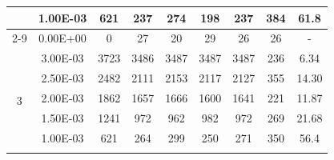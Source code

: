 \begin{table}[H]
{\begin{tabular}{|c|c|c|c|c|c|c|c|c|}
                               & 1.00E-03         & 621       & 237                                                        & 274                                                       & 198                                                       & 237     & 384    & 61.8                                                               \\ \cline{2-9}
                               & 0.00E+00         & 0         & 27                                                         & 20                                                        & 29                                                        & 26      & 26     & -                                                                  \\ \hline
            \multirow{6}{*}{3} & 3.00E-03         & 3723      & 3486                                                       & 3487                                                      & 3487                                                      & 3487    & 236    & 6.34                                                               \\ \cline{2-9}
                               & 2.50E-03         & 2482      & 2111                                                       & 2153                                                      & 2117                                                      & 2127    & 355    & 14.30                                                              \\ \cline{2-9}
                               & 2.00E-03         & 1862      & 1657                                                       & 1666                                                      & 1600                                                      & 1641    & 221    & 11.87                                                              \\ \cline{2-9}
                               & 1.50E-03         & 1241      & 972                                                        & 962                                                       & 982                                                       & 972     & 269    & 21.68                                                              \\ \cline{2-9}
                               & 1.00E-03         & 621       & 264                                                        & 299                                                       & 250                                                       & 271     & 350    & 56.4                                                               \\ \cline{2-9}

\end{tabular}}
\end{table}
